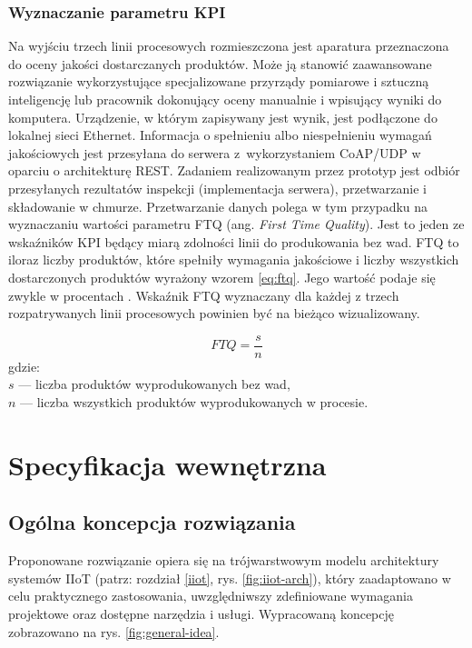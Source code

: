 \documentclass[a4paper, 12pt, twoside]{article}
\begin{document}
\subsubsection{Wyznaczanie parametru KPI}

Na wyjściu trzech linii procesowych rozmieszczona jest aparatura przeznaczona
do oceny jakości dostarczanych produktów. Może ją stanowić zaawansowane
rozwiązanie wykorzystujące specjalizowane przyrządy pomiarowe i sztuczną inteligencję lub
pracownik dokonujący oceny manualnie i wpisujący wyniki do komputera. Urządzenie,
w którym zapisywany jest wynik, jest podłączone do lokalnej sieci Ethernet.
Informacja o spełnieniu albo niespełnieniu wymagań jakościowych jest przesyłana
do serwera z~wykorzystaniem CoAP/UDP w oparciu o architekturę REST. Zadaniem
realizowanym przez prototyp jest odbiór przesyłanych rezultatów inspekcji
(implementacja serwera), przetwarzanie i składowanie w chmurze. Przetwarzanie
danych polega w tym przypadku na wyznaczaniu wartości parametru FTQ
(ang. \emph{First Time Quality}). Jest to jeden ze wskaźników KPI będący miarą
zdolności linii do produkowania bez wad. FTQ to iloraz liczby produktów,
które spełniły wymagania jakościowe i liczby wszystkich dostarczonych produktów
wyrażony wzorem \eqref{eq:ftq}.
Jego wartość podaje się zwykle w procentach \cite{isp}. Wskaźnik FTQ
wyznaczany dla każdej z trzech rozpatrywanych linii procesowych powinien być na bieżąco wizualizowany.

\begin{equation}
      FTQ = \frac{s}{n}\label{eq:ftq}
\end{equation}
\noindent gdzie: \\
$s$ --- liczba produktów wyprodukowanych bez wad,\\
$n$ --- liczba wszystkich produktów wyprodukowanych w procesie.



\section{Specyfikacja wewnętrzna}\label{spec-zew}

\subsection{Ogólna koncepcja rozwiązania}\label{ogolna-koncepcja}

Proponowane rozwiązanie opiera się na trójwarstwowym modelu architektury
systemów IIoT (patrz: rozdział \ref{iiot}, rys. \ref{fig:iiot-arch}), który
zaadaptowano w celu praktycznego zastosowania, uwzględniwszy zdefiniowane
wymagania projektowe oraz dostępne narzędzia i usługi. Wypracowaną koncepcję
zobrazowano na rys. \ref{fig:general-idea}.
\end{document}

